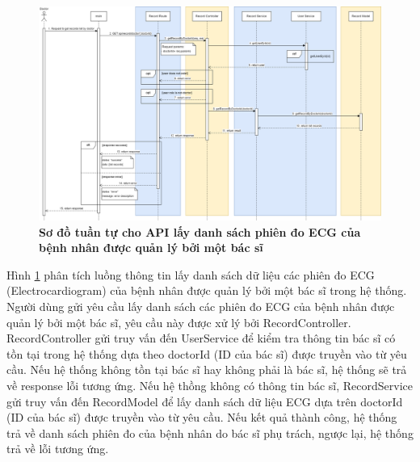  \begin{figure}[H]
  \centering
  \includegraphics[scale=0.3]{Images/sequence_api/getRecordsByDoctor.png}
  \caption[Sơ đồ tuần tự cho API lấy danh sách phiên đo ECG của bệnh nhân được quản lý bởi một bác sĩ ]{\bfseries \fontsize{12pt}{0pt}
  \selectfont Sơ đồ tuần tự cho API lấy danh sách phiên đo ECG của bệnh nhân được quản lý bởi một bác sĩ}
  \label{api_getRecordsByDoctor} %
\end{figure}
Hình \ref{api_getRecordsByDoctor} phân tích luồng thông tin lấy danh sách dữ liệu các phiên đo ECG (Electrocardiogram) của bệnh nhân được quản lý bởi một bác sĩ trong hệ thống. Người dùng gửi yêu cầu lấy danh sách các phiên đo ECG của bệnh nhân được quản lý bởi một bác sĩ, 
yêu cầu này được xử lý bởi RecordController. RecordController gửi truy vấn đến UserService để kiểm tra thông tin bác sĩ có tồn tại trong hệ thống dựa theo doctorId (ID của bác sĩ) được truyền vào từ yêu cầu. Nếu hệ thống không tồn tại bác sĩ hay không phải là bác sĩ, hệ thống sẽ
trả về response lỗi tương ứng. Nếu hệ thồng không có thông tin bác sĩ, RecordService gửi truy vấn đến RecordModel để lấy danh sách dữ liệu ECG dựa trên doctorId (ID của bác sĩ) được truyền vào từ yêu cầu. 
Nếu kết quả thành công, hệ thống trả về danh sách phiên đo của bệnh nhân do bác sĩ phụ trách, ngược lại, hệ thống trả về lỗi tương ứng.

